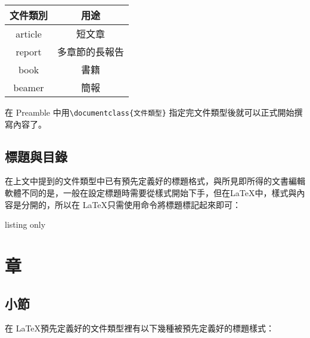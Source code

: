 \begin{tabular}{cc}
\hline
文件類別 & 用途 \\\hline\hline
article & 短文章 \\\hline
report & 多章節的長報告 \\\hline
book & 書籍 \\\hline
beamer & 簡報 \\\hline
\end{tabular}

在 Preamble 中用\verb|\documentclass{文件類型}| 指定完文件類型後就可以正式開始撰寫內容了。

\section{標題與目錄}

在上文中提到的文件類型中已有預先定義好的標題格式，與所見即所得的文書編輯軟體不同的是，一般在設定標題時需要從樣式開始下手，但在\LaTeX 中，樣式與內容是分開的，所以在 \LaTeX 只需使用命令將標題標記起來即可：

\begin{tcblisting}{listing only}
\chapter{章}
\section{小節}
\end{tcblisting}

在 \LaTeX 預先定義好的文件類型裡有以下幾種被預先定義好的標題樣式：

